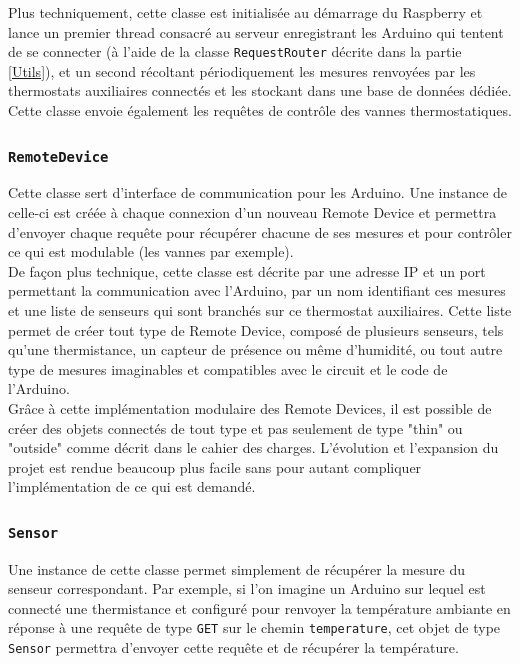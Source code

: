 \documentclass[11pt,a4paper,11pt]{report}
\begin{document}
Plus techniquement, cette classe est initialisée au démarrage du Raspberry et lance un premier thread consacré au serveur enregistrant les Arduino qui tentent de se connecter (à l'aide de la classe \texttt{RequestRouter} décrite dans la partie \ref{Utils}), et un second récoltant périodiquement les mesures renvoyées par les thermostats auxiliaires connectés et les stockant dans une base de données dédiée. Cette classe envoie également les requêtes de contrôle des vannes thermostatiques.


\subsubsection{\texttt{RemoteDevice}}

Cette classe sert d'interface de communication pour les Arduino. Une instance de celle-ci est créée à chaque connexion d'un nouveau Remote Device et permettra d'envoyer chaque requête pour récupérer chacune de ses mesures et pour contrôler ce qui est modulable (les vannes par exemple).\\

De façon plus technique, cette classe est décrite par une adresse IP et un port permettant la communication avec l'Arduino, par un nom identifiant ces mesures et une liste de senseurs qui sont branchés sur ce thermostat auxiliaires. Cette liste permet de créer tout type de Remote Device, composé de plusieurs senseurs, tels qu'une thermistance, un capteur de présence ou même d'humidité, ou tout autre type de mesures imaginables et compatibles avec le circuit et le code de l'Arduino.\\

Grâce à cette implémentation modulaire des Remote Devices, il est possible de créer des objets connectés de tout type et pas seulement de type "thin" ou "outside" comme décrit dans le cahier des charges. L’évolution et l'expansion du projet est rendue beaucoup plus facile sans pour autant compliquer l'implémentation de ce qui est demandé.\\

\subsubsection{\texttt{Sensor}}

Une instance de cette classe permet simplement de récupérer la mesure du senseur correspondant. Par exemple, si l'on imagine un Arduino sur lequel est connecté une thermistance et configuré pour renvoyer la température ambiante en réponse à une requête de type \texttt{GET} sur le chemin \texttt{temperature}, cet objet de type \texttt{Sensor} permettra d'envoyer cette requête et de récupérer la température. \\
\end{document}
